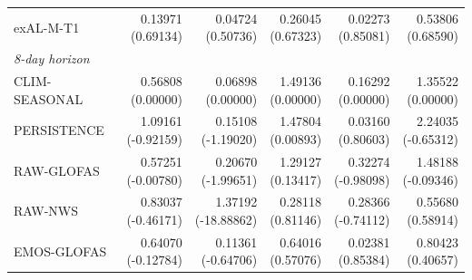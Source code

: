 \begin{table}[!htbp]
\begin{threeparttable}
\begin{tabular}{lrrrrr}
exAL-M-T1 & \shortstack[r]{0.13971\\(0.69134)} & \shortstack[r]{0.04724\\(0.50736)} & \shortstack[r]{0.26045\\(0.67323)} & \shortstack[r]{0.02273\\(0.85081)} & \shortstack[r]{0.53806\\(0.68590)} \\
\multicolumn{6}{l}{\textit{8-day horizon}} \\
CLIM-SEASONAL & \shortstack[r]{0.56808\\(0.00000)} & \shortstack[r]{0.06898\\(0.00000)} & \shortstack[r]{1.49136\\(0.00000)} & \shortstack[r]{0.16292\\(0.00000)} & \shortstack[r]{1.35522\\(0.00000)} \\
PERSISTENCE & \shortstack[r]{1.09161\\(-0.92159)} & \shortstack[r]{0.15108\\(-1.19020)} & \shortstack[r]{1.47804\\(0.00893)} & \shortstack[r]{0.03160\\(0.80603)} & \shortstack[r]{2.24035\\(-0.65312)} \\
RAW-GLOFAS & \shortstack[r]{0.57251\\(-0.00780)} & \shortstack[r]{0.20670\\(-1.99651)} & \shortstack[r]{1.29127\\(0.13417)} & \shortstack[r]{0.32274\\(-0.98098)} & \shortstack[r]{1.48188\\(-0.09346)} \\
RAW-NWS & \shortstack[r]{0.83037\\(-0.46171)} & \shortstack[r]{1.37192\\(-18.88862)} & \shortstack[r]{0.28118\\(0.81146)} & \shortstack[r]{0.28366\\(-0.74112)} & \shortstack[r]{0.55680\\(0.58914)} \\
EMOS-GLOFAS & \shortstack[r]{0.64070\\(-0.12784)} & \shortstack[r]{0.11361\\(-0.64706)} & \shortstack[r]{0.64016\\(0.57076)} & \shortstack[r]{0.02381\\(0.85384)} & \shortstack[r]{0.80423\\(0.40657)} \\

\end{tabular}
\end{threeparttable}
\end{table}
